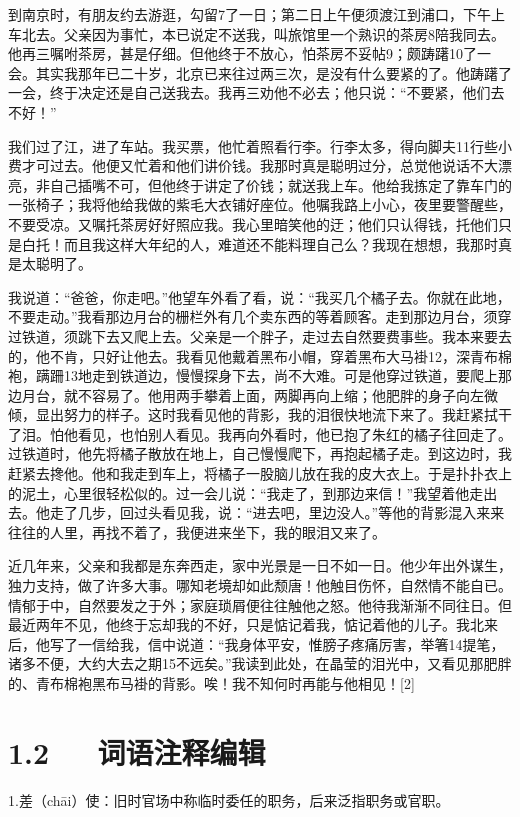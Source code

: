 \documentclass[letterpaper,10pt,english]{sphinxmanual}
\begin{document}
到南京时，有朋友约去游逛，勾留7了一日；第二日上午便须渡江到浦口，下午上车北去。父亲因为事忙，本已说定不送我，叫旅馆里一个熟识的茶房8陪我同去。他再三嘱咐茶房，甚是仔细。但他终于不放心，怕茶房不妥帖9；颇踌躇10了一会。其实我那年已二十岁，北京已来往过两三次，是没有什么要紧的了。他踌躇了一会，终于决定还是自己送我去。我再三劝他不必去；他只说：“不要紧，他们去不好！”

我们过了江，进了车站。我买票，他忙着照看行李。行李太多，得向脚夫11行些小费才可过去。他便又忙着和他们讲价钱。我那时真是聪明过分，总觉他说话不大漂亮，非自己插嘴不可，但他终于讲定了价钱；就送我上车。他给我拣定了靠车门的一张椅子；我将他给我做的紫毛大衣铺好座位。他嘱我路上小心，夜里要警醒些，不要受凉。又嘱托茶房好好照应我。我心里暗笑他的迂；他们只认得钱，托他们只是白托！而且我这样大年纪的人，难道还不能料理自己么？我现在想想，我那时真是太聪明了。

我说道：“爸爸，你走吧。”他望车外看了看，说：“我买几个橘子去。你就在此地，不要走动。”我看那边月台的栅栏外有几个卖东西的等着顾客。走到那边月台，须穿过铁道，须跳下去又爬上去。父亲是一个胖子，走过去自然要费事些。我本来要去的，他不肯，只好让他去。我看见他戴着黑布小帽，穿着黑布大马褂12，深青布棉袍，蹒跚13地走到铁道边，慢慢探身下去，尚不大难。可是他穿过铁道，要爬上那边月台，就不容易了。他用两手攀着上面，两脚再向上缩；他肥胖的身子向左微倾，显出努力的样子。这时我看见他的背影，我的泪很快地流下来了。我赶紧拭干了泪。怕他看见，也怕别人看见。我再向外看时，他已抱了朱红的橘子往回走了。过铁道时，他先将橘子散放在地上，自己慢慢爬下，再抱起橘子走。到这边时，我赶紧去搀他。他和我走到车上，将橘子一股脑儿放在我的皮大衣上。于是扑扑衣上的泥土，心里很轻松似的。过一会儿说：“我走了，到那边来信！”我望着他走出去。他走了几步，回过头看见我，说：“进去吧，里边没人。”等他的背影混入来来往往的人里，再找不着了，我便进来坐下，我的眼泪又来了。

近几年来，父亲和我都是东奔西走，家中光景是一日不如一日。他少年出外谋生，独力支持，做了许多大事。哪知老境却如此颓唐！他触目伤怀，自然情不能自已。情郁于中，自然要发之于外；家庭琐屑便往往触他之怒。他待我渐渐不同往日。但最近两年不见，他终于忘却我的不好，只是惦记着我，惦记着他的儿子。我北来后，他写了一信给我，信中说道：“我身体平安，惟膀子疼痛厉害，举箸14提笔，诸多不便，大约大去之期15不远矣。”我读到此处，在晶莹的泪光中，又看见那肥胖的、青布棉袍黑布马褂的背影。唉！我不知何时再能与他相见！{[}2{]}


\section{1.2   词语注释编辑}
\label{\detokenize{p01_u6563_u6587/_u6731_u81ea_u6e05-_u80cc_u5f71:id4}}
1.差（chāi）使：旧时官场中称临时委任的职务，后来泛指职务或官职。
\end{document}
